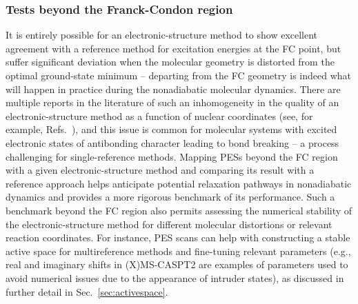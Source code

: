 \documentclass[9pt,bestpractices]{livecoms}
\begin{document}
\subsubsection{Tests beyond the Franck-Condon region}\label{sec:beyondfstest}
It is entirely possible for an electronic-structure method to show excellent agreement with a reference method for excitation energies at the FC point, but suffer significant deviation when the molecular geometry is distorted from the optimal ground-state minimum -- departing from the FC geometry is indeed what will happen in practice during the nonadiabatic molecular dynamics. There are multiple reports in the literature of such an inhomogeneity in the quality of an electronic-structure method as a function of nuclear coordinates (see, for example, Refs.~), and this issue is common for molecular systems with excited electronic states of antibonding character leading to bond breaking -- a process challenging for single-reference methods. Mapping PESs beyond the FC region with a given electronic-structure method and comparing its result with a reference approach helps anticipate potential relaxation pathways in nonadiabatic dynamics and provides a more rigorous benchmark of its performance. Such a benchmark beyond the FC region also permits assessing the numerical stability of the electronic-structure method for different molecular distortions or relevant reaction coordinates. For instance, PES scans can help with constructing a stable active space for multireference methods and fine-tuning relevant parameters (e.g., real and imaginary shifts in (X)MS-CASPT2 are examples of parameters used to avoid numerical issues due to the appearance of intruder states), as discussed in further detail in Sec.~\ref{sec:activespace}.
 
\end{document}
